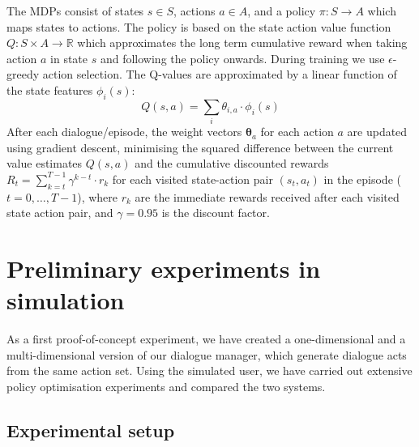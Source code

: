 \documentclass[11pt]{article}
\begin{document}
The MDPs consist of states $s \in S$, actions $a \in A$, and a policy $\pi:S \rightarrow A$ which maps states to actions.  The policy is based on the state action value function $Q:S \times A \rightarrow \mathbb{R}$ which approximates the long term cumulative reward when taking action $a$ in state $s$ and following the policy onwards.  During training we use $\epsilon$-greedy action selection.  The Q-values are approximated by a linear function of the state features $\phi_i(s)$:
\begin{equation}
Q(s,a) = \sum_i \theta_{i,a} \cdot \phi_i(s)
\end{equation}
After each dialogue/episode, the weight vectors $\mathbf{\theta}_a$ for each action $a$ are updated using gradient descent, minimising the squared difference between the current value estimates $Q(s,a)$ and the cumulative discounted rewards $R_t=\sum_{k=t}^{T-1} \gamma^{k-t} \cdot r_k$ for each visited state-action pair $(s_t,a_t)$ in the episode ($t = 0,\dots,T-1$), where $r_k$ are the immediate rewards received after each visited state action pair, and $\gamma=0.95$ is the discount factor.


\section{Preliminary experiments in simulation}\label{sec:sim-exp}

As a first proof-of-concept experiment, we have created a one-dimensional and a multi-dimensional version of our dialogue manager, which generate dialogue acts from the same action set.  Using the simulated user, we have carried out extensive policy optimisation experiments and compared the two systems.

\subsection{Experimental setup}
\end{document}
